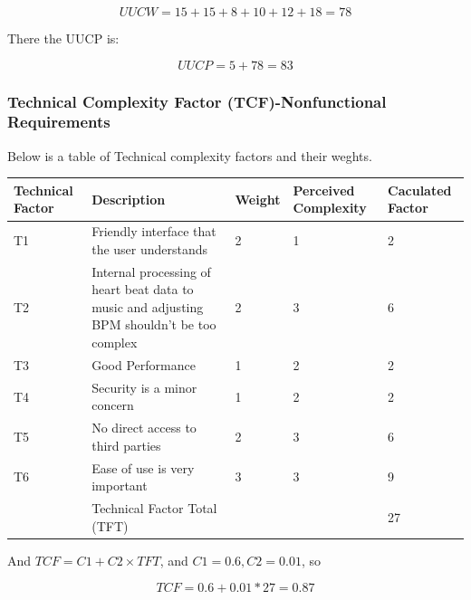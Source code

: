 \documentclass[letterpaper,english, 12pt]{scrreprt}
\begin{document}
\begin{equation}
UUCW = 15 + 15 + 8 + 10 + 12 + 18 = 78
\end{equation}

There the UUCP is:

\begin{equation}
UUCP = 5 + 78 = 83
\end{equation}

\subsubsection{Technical Complexity Factor (TCF)-Nonfunctional Requirements}

Below is a table of Technical complexity factors and their weghts.

\begin{center}
        \begin{tabular}{|C{2cm}|C{5cm}|C{1.5cm}|C{2cm}|C{2cm}|}
                \hline
                        Technical Factor & Description & Weight & Perceived Complexity & Caculated Factor \\
                \hline
                        T1 & Friendly interface that the user understands & 2 & 1 & 2 \\
                \hline
                        T2 & Internal processing of heart beat data to music and adjusting BPM shouldn't be too complex & 2 & 3 & 6\\
                \hline
                        T3 & Good Performance & 1 & 2 & 2 \\
                \hline
                        T4 & Security is a minor concern & 1 & 2 & 2 \\
                \hline
                        T5 & No direct access to third parties & 2 & 3 & 6 \\
                \hline
                        T6 & Ease of use is very important & 3 & 3 & 9\\
                \hline   
                        & Technical Factor Total (TFT) & & & 27 \\
                \hline
        \end{tabular}
\end{center}

And $TCF = C1 + C2 \times TFT$, and $C1 = 0.6, C2 = 0.01$, so

\begin{equation}
TCF = 0.6 + 0.01*27 = 0.87
\end{equation}
\end{document}
